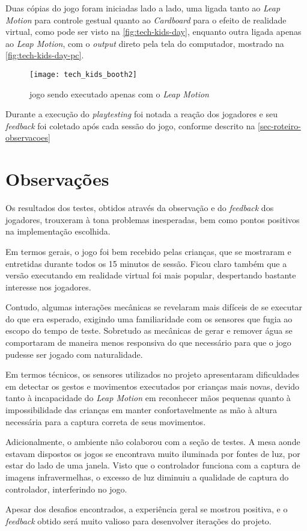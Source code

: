 Duas cópias do jogo foram iniciadas lado a lado, uma ligada tanto 
ao \textit{Leap Motion} para controle gestual quanto ao \textit{Cardboard} 
para o efeito de realidade virtual, como pode ser visto 
na \autoref{fig:tech-kids-day}, enquanto outra ligada apenas ao 
\textit{Leap Motion}, com o \textit{output} direto pela tela do computador, 
mostrado na \autoref{fig:tech-kids-day-pc}.

\begin{figure}[h]
	\centering
	\caption{jogo sendo executado apenas com o \textit{Leap Motion}}
	\texttt{[image: tech\_kids\_booth2]}
	\legend{\fonteAP}
	\label{fig:tech-kids-day-pc}
\end{figure}

Durante a execução do \textit{playtesting} foi notada a reação dos 
jogadores e seu \textit{feedback} foi coletado após cada sessão do jogo, 
conforme descrito na \autoref{sec-roteiro-observacoes}

\section{Observações}\label{sec-roteiro-observacoes}

Os resultados dos testes, obtidos através da observação e do 
\textit{feedback} dos jogadores, trouxeram à tona problemas inesperadas, 
bem como pontos positivos na implementação escolhida.

Em termos gerais, o jogo foi bem recebido pelas crianças, que se 
mostraram e entretidas durante todos os 15 minutos de sessão. Ficou claro 
também que a versão executando em realidade virtual foi mais popular, 
despertando bastante interesse nos jogadores.

Contudo, algumas interações mecânicas se revelaram mais difíceis de se 
executar do que era esperado, exigindo uma familiaridade com os sensores 
que fugia ao escopo do tempo de teste. Sobretudo as mecânicas de gerar e 
remover água se comportaram de maneira menos responsiva do que necessário 
para que o jogo pudesse ser jogado com naturalidade.

Em termos técnicos, os sensores utilizados no projeto apresentaram 
dificuldades em detectar os gestos e movimentos executados por crianças 
mais novas, devido tanto à incapacidade do \textit{Leap Motion} em 
reconhecer mãos pequenas quanto à impossibilidade das crianças em 
manter confortavelmente as mão à altura necessária para a captura 
correta de seus movimentos. 

Adicionalmente, o ambiente não colaborou com a seção de testes. A mesa 
aonde estavam dispostos os jogos se encontrava muito iluminada por 
fontes de luz, por estar do lado de uma janela. Visto que o controlador 
funciona com a captura de imagens infravermelhas, o excesso de luz 
diminuiu a qualidade de captura do controlador, interferindo no jogo.

Apesar dos desafios encontrados, a experiência geral se mostrou 
positiva, e o \textit{feedback} obtido será muito valioso para desenvolver 
iterações do projeto.